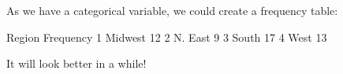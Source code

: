 \documentclass[11pt]{article}
\begin{document}
\clearpage
As we have a categorical variable, we could create a frequency table:

\begin{Schunk}
\begin{Soutput}
   Region Frequency
1 Midwest        12
2 N. East         9
3   South        17
4    West        13
\end{Soutput}
\end{Schunk}

It will look better in a while!
\end{document}

